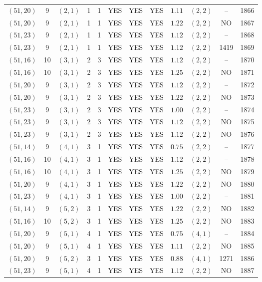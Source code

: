 \begin{longtable}{|c|c|c|c|c|c|c|c|c|c|c|c|}
$(51,20)$ & 9 & $(2,1)$ & 1 & 1 & YES & YES & YES & $1.11$ & $(2,2)$ & -- & 1866\\
$(51,20)$ & 9 & $(2,1)$ & 1 & 1 & YES & YES & YES & $1.22$ & $(2,2)$ & NO & 1867\\
$(51,23)$ & 9 & $(2,1)$ & 1 & 1 & YES & YES & YES & $1.12$ & $(2,2)$ & -- & 1868\\
$(51,23)$ & 9 & $(2,1)$ & 1 & 1 & YES & YES & YES & $1.12$ & $(2,2)$ & 1419 & 1869\\
$(51,16)$ & 10 & $(3,1)$ & 2 & 3 & YES & YES & YES & $1.12$ & $(2,2)$ & -- & 1870\\
$(51,16)$ & 10 & $(3,1)$ & 2 & 3 & YES & YES & YES & $1.25$ & $(2,2)$ & NO & 1871\\
$(51,20)$ & 9 & $(3,1)$ & 2 & 3 & YES & YES & YES & $1.12$ & $(2,2)$ & -- & 1872\\
$(51,20)$ & 9 & $(3,1)$ & 2 & 3 & YES & YES & YES & $1.22$ & $(2,2)$ & NO & 1873\\
$(51,23)$ & 9 & $(3,1)$ & 2 & 3 & YES & YES & YES & $1.00$ & $(2,2)$ & -- & 1874\\
$(51,23)$ & 9 & $(3,1)$ & 2 & 3 & YES & YES & YES & $1.12$ & $(2,2)$ & NO & 1875\\
$(51,23)$ & 9 & $(3,1)$ & 2 & 3 & YES & YES & YES & $1.12$ & $(2,2)$ & NO & 1876\\
$(51,14)$ & 9 & $(4,1)$ & 3 & 1 & YES & YES & YES & $0.75$ & $(2,2)$ & -- & 1877\\
$(51,16)$ & 10 & $(4,1)$ & 3 & 1 & YES & YES & YES & $1.12$ & $(2,2)$ & -- & 1878\\
$(51,16)$ & 10 & $(4,1)$ & 3 & 1 & YES & YES & YES & $1.25$ & $(2,2)$ & NO & 1879\\
$(51,20)$ & 9 & $(4,1)$ & 3 & 1 & YES & YES & YES & $1.22$ & $(2,2)$ & NO & 1880\\
$(51,23)$ & 9 & $(4,1)$ & 3 & 1 & YES & YES & YES & $1.00$ & $(2,2)$ & -- & 1881\\
$(51,14)$ & 9 & $(5,2)$ & 3 & 1 & YES & YES & YES & $1.22$ & $(2,2)$ & NO & 1882\\
$(51,16)$ & 10 & $(5,2)$ & 3 & 1 & YES & YES & YES & $1.25$ & $(2,2)$ & NO & 1883\\
$(51,20)$ & 9 & $(5,1)$ & 4 & 1 & YES & YES & YES & $0.75$ & $(4,1)$ & -- & 1884\\
$(51,20)$ & 9 & $(5,1)$ & 4 & 1 & YES & YES & YES & $1.11$ & $(2,2)$ & NO & 1885\\
$(51,20)$ & 9 & $(5,2)$ & 3 & 1 & YES & YES & YES & $0.88$ & $(4,1)$ & 1271 & 1886\\
$(51,23)$ & 9 & $(5,1)$ & 4 & 1 & YES & YES & YES & $1.12$ & $(2,2)$ & NO & 1887\\

\end{longtable}

